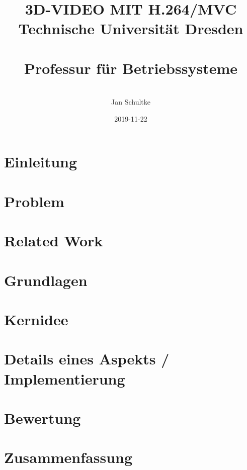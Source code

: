 \documentclass{article}
\title{\textbf{\LARGE 3D-VIDEO MIT H.264/MVC
\\{\Large Technische Universit\"at Dresden}
\\\noindent\newline{\large Hauptseminar Betriebssysteme}
\\{\small Professur f\"ur Betriebssysteme}
}}
\author{\\ \Large Jan Schultke}
\date{\large2019-11-22}
\begin{document}
    \maketitle
    \clearpage
    \pagebreak

    \tableofcontents
    \clearpage
    \pagebreak

    \section{Einleitung}\label{sec:intro}
    

    \pagebreak

    \section{Problem}\label{sec:problem}
    

    \pagebreak

    \section{Related Work}\label{sec:relwork}
    

    \pagebreak

    \section{Grundlagen}\label{sec:basics}
    

    \pagebreak

    \section{Kernidee}\label{sec:idea}
    

    \pagebreak

    \section{Details eines Aspekts / Implementierung}\label{sec:impl}
    

    \pagebreak

    \section{Bewertung}\label{sec:eval}
    

    \pagebreak

    \section{Zusammenfassung}\label{sec:summary}
    

    \pagebreak

    
\end{document}
